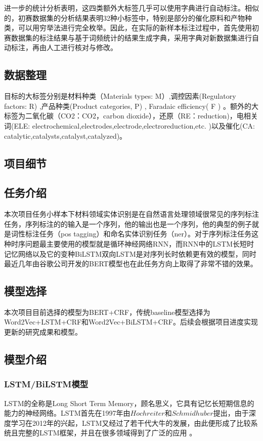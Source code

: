 \documentclass{article}
\begin{document}
进一步的统计分析表明，这四类额外大标签几乎可以使用字典进行自动标注。相似的，初赛数据集的分析结果表明32种小标签中，特别是部分的催化原料和产物种类，可以用穷举法进行完全枚举。因此，在实际的新样本标注过程中，首先使用初赛数据集的标注结果与基于词频统计的结果生成字典，采用字典对新数据集进行自动标注，再由人工进行核对与修改。

\subsection{数据整理}
目标的大标签分别是材料种类（Materials types: M）,调控因素(Regulatory factors: R) ,产品种类(Product categories, P) , Faradaic efficiency( F ) 。额外的大标签为二氧化碳（CO2：CO2，carbon dioxide），还原（RE：reduction)，电相关词(ELE: electrochemical,electrodes,electrode,electroreduction,etc. )以及催化(CA: catalytic,catalysts,catalyst,catalyzed)。

\newpage
\begin{center}
	\section{项目细节}
\end{center}

\subsection{任务介绍}
本次项目任务小样本下材料领域实体识别是在自然语言处理领域很常见的序列标注任务，序列标注的的输入是一个序列，他的输出也是一个序列，他的典型的例子就是词性标注任务（pos tagging）和命名实体识别任务（ner）。对于序列标注任务这种时序问题最主要使用的模型就是循环神经网络RNN，而RNN中的LSTM长短时记忆网络以及它的变种BiLSTM双向LSTM是对序列长时依赖更有效的模型，同时最近几年由谷歌公司开发的BERT模型也在此任务方向上取得了非常不错的效果。
\subsection{模型选择}
本次项目目前选择的模型为BERT+CRF，传统baseline模型选择为Word2Vec+LSTM+CRF和Word2Vec+BiLSTM+CRF。后续会根据项目进度实现更新的研究成果和模型。
\subsection{模型介绍}

\subsubsection{LSTM/BiLSTM模型}
LSTM的全称是Long Short Term Memory，顾名思义，它具有记忆长短期信息的能力的神经网络。LSTM首先在1997年由$Hochreiter$和$Schmidhuber$提出，由于深度学习在2012年的兴起，LSTM又经过了若干代大牛的发展，由此便形成了比较系统且完整的LSTM框架，并且在很多领域得到了广泛的应用\cite{schmidhuber2002learning} 。
\end{document}
